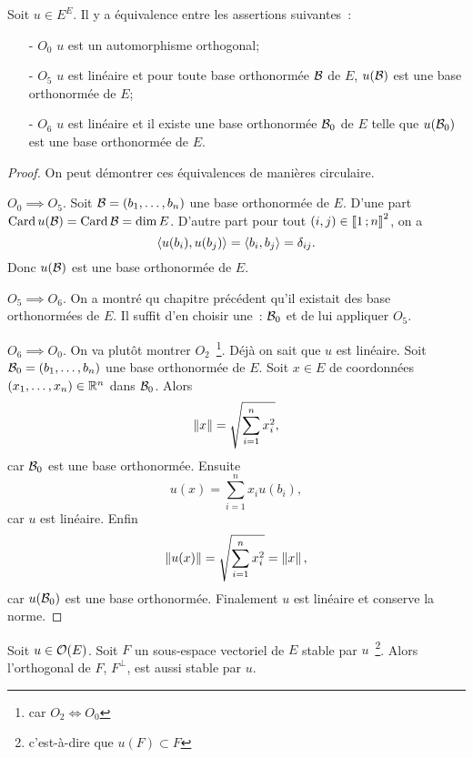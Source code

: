 \begin{theo}
  Soit $u \in E^E$. Il y a équivalence entre les assertions suivantes~:
  \begin{enumerate}
    \item[- $O_0$] $u$ est un automorphisme orthogonal;
    \item[- $O_5$] $u$ est linéaire et pour toute base orthonormée $\mathcal{B}$ de $E$, $u(\mathcal{B})$ est une base orthonormée de $E$;
    \item[- $O_6$] $u$ est linéaire et il existe une base orthonormée $\mathcal{B}_0$ de $E$ telle que $u(\mathcal{B}_0)$ est une base orthonormée de $E$.
  \end{enumerate}
\end{theo}
\begin{proof}
  On peut démontrer ces équivalences de manières circulaire.

  $O_0 \implies O_5$. Soit $\mathcal{B}=(b_1, \dotsc, b_n)$ une base orthonormée de $E$. D'une part $\operatorname{Card} u(\mathcal{B})=\operatorname{Card} \mathcal{B}=\operatorname{dim} E$. D'autre part pour tout $(i,j) \in \mathopen{\llbracket}1\mathclose{}\mathpunct{};n\mathclose{\rrbracket}^2$, on a
  \begin{equation}
    \left\langle{u(b_i)},{u(b_j)}\right\rangle=\left\langle{b_i},{b_j}\right\rangle=\delta_{ij}.
  \end{equation}
  Donc $u(\mathcal{B})$ est une base orthonormée de $E$.

  $O_5 \implies O_6$. On a montré qu chapitre précédent qu'il existait des base orthonormées de $E$. Il suffit d'en choisir une~: $\mathcal{B}_0$ et de lui appliquer $O_5$.

  $O_6 \implies O_0$. On va plutôt montrer $O_2$~\footnote{car $O_2 \iff O_0$}. Déjà on sait que $u$ est linéaire. Soit $\mathcal{B}_0 = (b_1, \dotsc, b_n)$ une base orthonormée de $E$. Soit $x \in E$ de coordonnées $(x_1, \dotsc, x_n) \in \mathbb{R}^n$ dans $\mathcal{B}_0$. Alors
  \begin{equation}
    \left\lVert x\right\rVert = \sqrt{\sum_{i=1}^n x_i^2},
  \end{equation}
  car $\mathcal{B}_0$ est une base orthonormée. Ensuite
  \begin{equation}
    u(x) = \sum_{i=1}^n x_i u(b_i),
  \end{equation}
  car $u$ est linéaire. Enfin
  \begin{equation}
    \left\lVert u(x)\right\rVert = \sqrt{\sum_{i=1}^n x_i^2}=\left\lVert x\right\rVert,
  \end{equation}
  car $u(\mathcal{B}_0)$ est une base orthonormée. Finalement $u$ est linéaire et conserve la norme.
\end{proof}
\begin{prop}
  Soit $u \in \mathcal{O}\!\left(E\right)$. Soit $F$ un sous-espace vectoriel de $E$ stable par $u$~\footnote{c'est-à-dire que $u(F)\subset F$}. Alors l'orthogonal de $F$, $F^\perp$, est aussi stable par $u$.
\end{prop}
